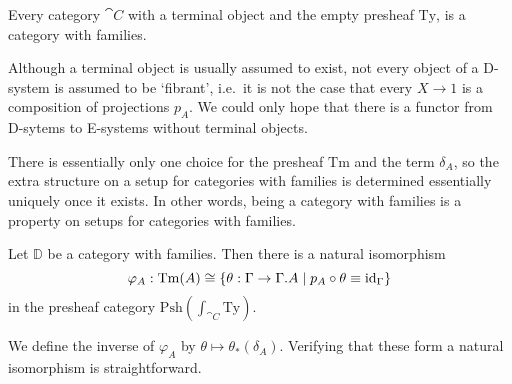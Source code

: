 \begin{eg}
Every category $\cat{C}$ with a terminal object and the empty presheaf 
$\mathrm{Ty}$, is a category with families.
\end{eg}

\begin{rmk}
Although a terminal object is usually assumed to exist, not every object 
of a D-system is assumed to be `fibrant', i.e.~it is
not the case that every $X\to 1$ is a composition of projections $p_A$.
We could only hope that there is a functor from D-sytems to E-systems without
terminal objects.
\end{rmk}

There is essentially only one choice for the presheaf $\mathrm{Tm}$ and the
term $\delta_A$, so the extra structure on a setup for categories with families
is determined essentially uniquely once it exists. In other words, being a
category with families is a property on setups for categories with families.

\begin{defn}\label{lem:cwf_to_dsys}
Let $\mathbb{D}$ be a category with families. Then there is a natural isomorphism
\begin{equation*}
\varphi_A:\mathrm{Tm}(A)\cong\{\theta:\Gamma\to\ctxext{\Gamma}{A}\mid p_A\circ\theta\jdeq\catid{\Gamma}\}
\end{equation*}
in the presheaf category $\mathrm{Psh}(\int_{\cat{C}}\mathrm{Ty})$. 
\begin{comment}
The
natural isomorphism $\varphi$ is such that the term $\delta_A\in\mathrm{Tm}((p_A)_\ast(A))$
corresponds to the unique arrow $\tilde{q}_A$ which fits in the diagram
\begin{equation*}
\begin{tikzcd}
\ctxext{\Gamma}{A} \arrow[ddr,bend right=15,equals] \arrow[drr,bend left=15,equals] \arrow[dr,"{\tilde \delta_A}"] \\
& \ctxext{{\Gamma}{A}}{(p_A)_\ast(A)} \arrow[d,fib] & \ctxext{\Gamma}{A} \arrow[d,fib] \\
& \ctxext{\Gamma}{A} \arrow[r,"{p_A}"] & \Gamma
\end{tikzcd}
\end{equation*}
\end{comment}
\end{defn}

\begin{constr}
We define the inverse of $\varphi_A$ by $\theta\mapsto\theta_\ast(\delta_A)$. Verifying
that these form a natural isomorphism is straightforward.
\end{constr}

